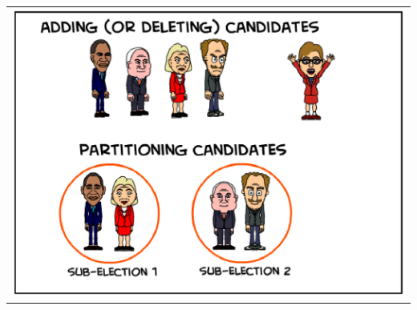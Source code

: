 \documentclass[a0paper,portrait]{baposter}
\begin{document}
\begin{poster}
{\begin{tabular}{c}
\phantom{\tiny{xxxxx}}\includegraphics[width=0.75\linewidth]{addingcand.eps} 


\end{tabular}
}
\end{poster}
\end{document}
